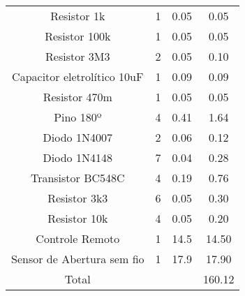 \begin{table}[hbp]
\begin{tabular}{cccc}
		Resistor 1k & 1 & 0.05 & 0.05 \\
		Resistor 100k & 1 & 0.05 & 0.05 \\
		Resistor 3M3 & 2 & 0.05 & 0.10 \\
		Capacitor eletrolítico 10uF & 1 & 0.09 & 0.09 \\
		Resistor 470m & 1 & 0.05 & 0.05 \\
		Pino 180º & 4 & 0.41 & 1.64 \\
		Diodo 1N4007 & 2 & 0.06 & 0.12 \\
		Diodo 1N4148 & 7 & 0.04 & 0.28 \\
		Transistor BC548C & 4 & 0.19 & 0.76 \\
		Resistor 3k3 & 6 & 0.05 & 0.30 \\
		Resistor 10k & 4 & 0.05 & 0.20 \\
		Controle Remoto & 1 & 14.5 & 14.50 \\
		Sensor de Abertura sem fio & 1 & 17.9 & 17.90 \\
		Total &  &  & 160.12 \\
		\bottomrule
	\end{tabular}
\end{table}
